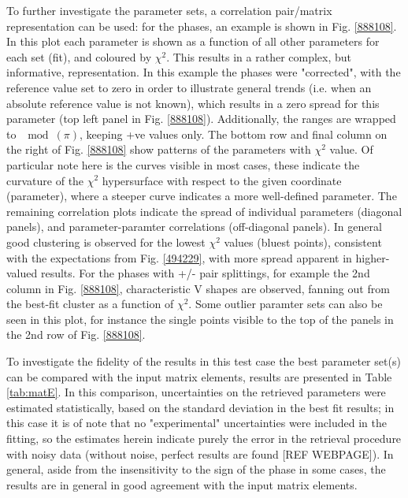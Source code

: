 To further investigate the parameter sets, a correlation pair/matrix representation can be used: for the phases, an example is shown in Fig. \ref{888108}. In this plot each parameter is shown as a function of all other parameters for each set (fit), and coloured by $\chi^2$. This results in a rather complex, but informative, representation. In this example the phases were "corrected", with the reference value set to zero in order to illustrate general trends (i.e. when an absolute reference value is not known), which results in a zero spread for this parameter (top left panel in Fig. \ref{888108}). Additionally, the ranges are wrapped to $\mod(\pi)$, keeping +ve values only. The bottom row and final column on the right of Fig. \ref{888108} show patterns of the parameters with $\chi^2$ value. Of particular note here is the curves visible in most cases, these indicate the curvature of the $\chi^2$ hypersurface with respect to the given coordinate (parameter), where a steeper curve indicates a more well-defined parameter. The remaining correlation plots indicate the spread of individual parameters (diagonal panels), and parameter-paramter correlations (off-diagonal panels). In general good clustering is observed for the lowest $\chi^2$ values (bluest points), consistent with the expectations from Fig. \ref{494229}, with more spread apparent in higher-valued results. For the phases with +/- pair splittings, for example the 2nd column in Fig. \ref{888108}, characteristic V shapes are observed, fanning out from the best-fit cluster as a function of $\chi^2$. Some outlier paramter sets can also be seen in this plot, for instance the single points visible to the top of the panels in the 2nd row of Fig. \ref{888108}.

To investigate the fidelity of the results in this test case the best parameter set(s) can be compared with the input matrix elements, results are presented in Table \ref{tab:matE}. In this comparison, uncertainties on the retrieved parameters were estimated statistically, based on the standard deviation in the best fit results; in this case it is of note that no "experimental" uncertainties were included in the fitting, so the estimates herein indicate purely the error in the retrieval procedure with noisy data (without noise, perfect results are found [REF WEBPAGE]). In general, aside from the insensitivity to the sign of the phase in some cases, the results are in general in good agreement with the input matrix elements.

